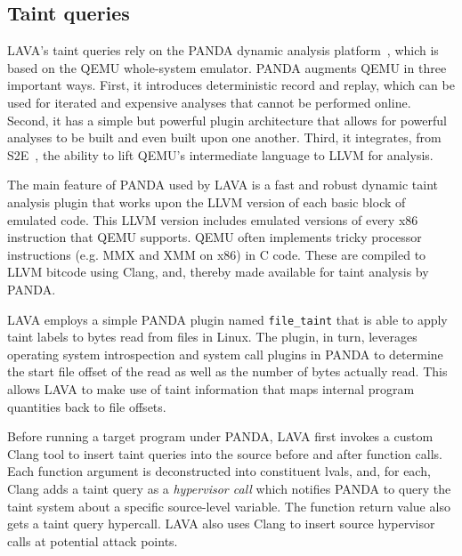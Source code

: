 \subsection{Taint queries}
LAVA's taint queries rely on the PANDA dynamic analysis platform~\cite{PANDA}, which is based on the QEMU whole-system emulator.
PANDA augments QEMU in three important ways.
First, it introduces deterministic record and replay, which can be used for iterated and expensive analyses that cannot be performed online.
Second, it has a simple but powerful plugin architecture that allows for powerful analyses to be built and even built upon one another.
Third, it integrates, from S2E~\cite{S2E}, the ability to lift QEMU's intermediate language to LLVM for analysis.

The main feature of PANDA used by LAVA is a fast and robust dynamic taint analysis plugin that works upon the LLVM version of each 
basic block of emulated code.
This LLVM version includes emulated versions of every x86 instruction that QEMU supports.
QEMU often implements tricky processor instructions (e.g. MMX and XMM on x86) in C code.
These are compiled to LLVM bitcode using Clang, and, thereby made available for taint analysis by PANDA.

LAVA employs a simple PANDA plugin named \verb+file_taint+ that is able to apply taint labels to bytes read from files in Linux.
The plugin, in turn, leverages operating system introspection and system call plugins in PANDA to determine the start file offset of the read as well as the number of bytes actually read.
This allows LAVA to make use of taint information that maps internal program quantities back to file offsets.

Before running a target program under PANDA, LAVA first invokes a custom Clang tool to insert taint queries into the source before and after function calls.
Each function argument is deconstructed into constituent lvals, and, for each, Clang adds a taint query as a \emph{hypervisor call} which notifies PANDA to query the taint system about a specific source-level variable.
The function return value also gets a taint query hypercall.
LAVA also uses Clang to insert source hypervisor calls at potential attack points.

